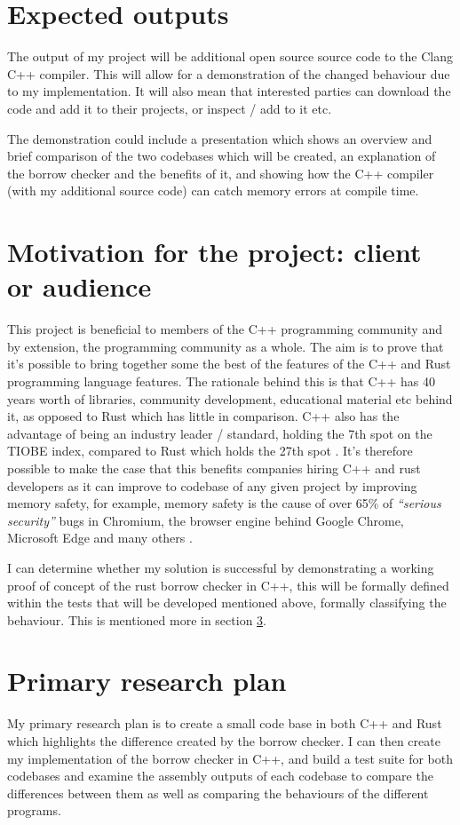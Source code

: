 \documentclass{article}
\begin{document}
\section{Expected outputs}
The output of my project will be additional open source source code to the Clang C++ compiler. This will allow for a demonstration of the changed behaviour due to my implementation. It will also mean that interested parties can download the code and add it to their projects, or inspect / add to it etc.

The demonstration could include a presentation which shows an overview and brief comparison of the two codebases which will be created, an explanation of the borrow checker and the benefits of it, and showing how the C++ compiler (with my additional source code) can catch memory errors at compile time.

\section{Motivation for the project: client or audience}
This project is beneficial to members of the C++ programming community and by extension, the programming community as a whole. The aim is to prove that it's possible to bring together some the best of the features of the C++ and Rust programming language features. The rationale behind this is that C++ has 40 years worth of libraries, community development, educational material etc behind it, as opposed to Rust which has little in comparison. C++ also has the advantage of being an industry leader / standard, holding the 7th spot on the TIOBE index, compared to Rust which holds the 27th spot \parencite{tiobe_index}. It's therefore possible to make the case that this benefits companies hiring C++ and rust developers as it can improve to codebase of any given project by improving memory safety, for example, memory safety is the cause of over 65\% of \emph{``serious security''} bugs in Chromium, the browser engine behind Google Chrome, Microsoft Edge and many others \parencite{chromium_bugs}.

I can determine whether my solution is successful by demonstrating a working proof of concept of the rust borrow checker in C++, this will be formally defined within the tests that will be developed mentioned above, formally classifying the behaviour. This is mentioned more in section \ref{primary_research_plan}.


\section{Primary research plan}\label{primary_research_plan}
My primary research plan is to create a small code base in both C++ and Rust which highlights the difference created by the borrow checker. I can then create my implementation of the borrow checker in C++, and build a test suite for both codebases and examine the assembly outputs of each codebase to compare the differences between them as well as comparing the behaviours of the different programs.
\end{document}
